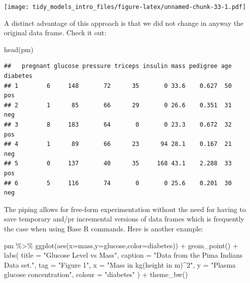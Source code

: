 \documentclass[
]{article}
\newenvironment{Shaded}{\begin{snugshade}}{\end{snugshade}}
\newcommand{\AttributeTok}[1]{\textcolor[rgb]{0.77,0.63,0.00}{#1}}
\newcommand{\FunctionTok}[1]{\textcolor[rgb]{0.00,0.00,0.00}{#1}}
\newcommand{\NormalTok}[1]{#1}
\newcommand{\SpecialCharTok}[1]{\textcolor[rgb]{0.00,0.00,0.00}{#1}}
\newcommand{\StringTok}[1]{\textcolor[rgb]{0.31,0.60,0.02}{#1}}
\begin{document}
\texttt{[image: tidy\_models\_intro\_files/figure-latex/unnamed-chunk-33-1.pdf]}

A distinct advantage of this approach is that we did not change in
anyway the original data frame. Check it out:

\begin{Shaded}
\begin{Highlighting}[]
\FunctionTok{head}\NormalTok{(pm)}
\end{Highlighting}
\end{Shaded}

\begin{verbatim}
##   pregnant glucose pressure triceps insulin mass pedigree age diabetes
## 1        6     148       72      35       0 33.6    0.627  50      pos
## 2        1      85       66      29       0 26.6    0.351  31      neg
## 3        8     183       64       0       0 23.3    0.672  32      pos
## 4        1      89       66      23      94 28.1    0.167  21      neg
## 5        0     137       40      35     168 43.1    2.288  33      pos
## 6        5     116       74       0       0 25.6    0.201  30      neg
\end{verbatim}

The piping allows for free-form experimentation without the need for
having to save temporary and/pr incremental versions of data frames
which is frequently the case when using Base R commands. Here is another
example:

\begin{Shaded}
\begin{Highlighting}[]
\NormalTok{pm }\SpecialCharTok{\%\textgreater{}\%}
  \FunctionTok{ggplot}\NormalTok{(}\FunctionTok{aes}\NormalTok{(}\AttributeTok{x=}\NormalTok{mass,}\AttributeTok{y=}\NormalTok{glucose,}\AttributeTok{color=}\NormalTok{diabetes)) }\SpecialCharTok{+} 
  \FunctionTok{geom\_point}\NormalTok{() }\SpecialCharTok{+}
  \FunctionTok{labs}\NormalTok{(}
    \AttributeTok{title =} \StringTok{"Glucose Level vs Mass"}\NormalTok{,}
    \AttributeTok{caption =} \StringTok{"Data from the Pima Indians Data set."}\NormalTok{,}
    \AttributeTok{tag =} \StringTok{"Figure 1"}\NormalTok{,}
    \AttributeTok{x =} \StringTok{"Mass in kg(height in m)\^{}2"}\NormalTok{,}
    \AttributeTok{y =} \StringTok{"Plasma glucose concentration"}\NormalTok{,}
    \AttributeTok{colour =} \StringTok{"diabetes"}
\NormalTok{  ) }\SpecialCharTok{+} \FunctionTok{theme\_bw}\NormalTok{()}
\end{Highlighting}
\end{Shaded}
\end{document}
